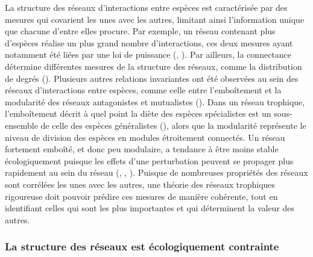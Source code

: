 La structure des réseaux d'interactions entre espèces est caractérisée par des
mesures qui covarient les unes avec les autres, limitant ainsi l'information
unique que chacune d'entre elles procure. Par exemple, un réseau contenant plus
d'espèces réalise un plus grand nombre d'interactions, ces deux mesures ayant
notamment été liées par une loi de puissance (\cite{Brose2004Unified},
\cite{Riede2010Chapter}). Par ailleurs, la connectance détermine différentes
mesures de la structure des réseaux, comme la distribution de degrés
(\cite{Poisot2014When}). Plusieurs autres relations invariantes ont été
observées au sein des réseaux d'interactions entre espèces, comme celle entre
l'emboîtement et la modularité des réseaux antagonistes et mutualistes
(\cite{Fortuna2010Nestedness}). Dans un réseau trophique, l'emboîtement décrit à
quel point la diète des espèces spécialistes est un sous-ensemble de celle des
espèces généralistes (\cite{Staniczenko2013Ghost}), alors que la modularité
représente le niveau de division des espèces en modules étroitement connectés.
Un réseau fortement emboîté, et donc peu modulaire, a tendance à être moins
stable écologiquement puisque les effets d'une perturbation peuvent se propager
plus rapidement au sein du réseau (\cite{Okuyama2008Network},
\cite{Bastolla2009Architecture}, \cite{Thebault2010Stability}). Puisque de
nombreuses propriétés des réseaux sont corrélées les unes avec les autres, une
théorie des réseaux trophiques rigoureuse doit pouvoir prédire ces mesures de
manière cohérente, tout en identifiant celles qui sont les plus importantes et
qui déterminent la valeur des autres.

\subsubsection{La structure des réseaux est écologiquement contrainte} 

